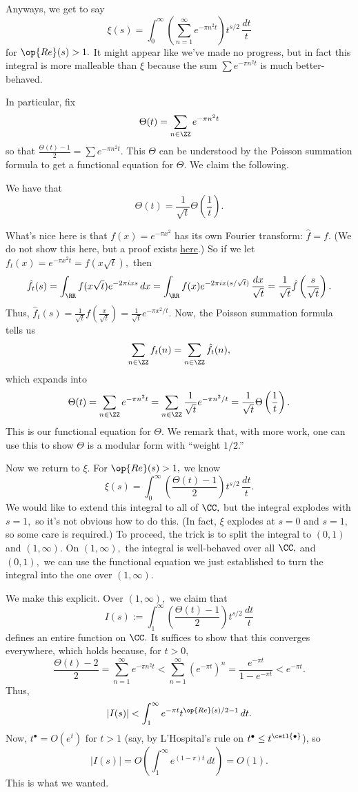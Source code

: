 Anyways, we get to say
\[\xi(s)=\int_0^\infty\left(\sum_{n=1}^\infty e^{-\pi n^2t}\right)t^{s/2}\,\frac{dt}t\]
for $\op{Re}(s)>1.$ It might appear like we've made no progress, but in fact this integral is more malleable than $\xi$ because the sum $\sum e^{-\pi n^2t}$ is much better-behaved.

In particular, fix
\[\Theta(t)=\sum_{n\in\ZZ}e^{-\pi n^2t}\]
so that $\frac{\Theta(t)-1}2=\sum e^{-\pi n^2t}.$ This $\Theta$ can be understood by the Poisson summation formula to get a functional equation for $\Theta.$ We claim the following.
\begin{lemma}
    We have that
    \[\Theta(t)=\frac1{\sqrt t}\Theta\left(\frac1t\right).\]
\end{lemma}
What's nice here is that $f(x)=e^{-\pi x^2}$ has its own Fourier transform: $\hat f=f.$ (We do not show this here, but a proof exists \href{https://math.stackexchange.com/questions/270566/how-to-calculate-the-fourier-transform-of-a-gaussian-function}{here}.) So if we let $f_t(x)=e^{-\pi x^2t}=f(x\sqrt t),$ then
\[\hat f_t(s)=\int_\RR f(x\sqrt t)e^{-2\pi ixs}\,dx=\int_\RR f(x)e^{-2\pi ix(s/\sqrt t)}\,\frac{dx}{\sqrt t}=\frac1{\sqrt t}\hat f\left(\frac s{\sqrt t}\right).\]
Thus, $\hat f_t(s)=\frac1{\sqrt t}f\left(\frac x{\sqrt t}\right)=\frac1{\sqrt t}e^{-\pi x^2/t}.$ Now, the Poisson summation formula tells us
\[\sum_{n\in\ZZ}f_t(n)=\sum_{n\in\ZZ}\hat f_t(n),\]
which expands into
\[\Theta(t)=\sum_{n\in\ZZ}e^{-\pi n^2t}=\sum_{n\in\ZZ}\frac1{\sqrt t}e^{-\pi n^2/t}=\frac1{\sqrt t}\Theta\left(\frac1t\right).\]
This is our functional equation for $\Theta.$ We remark that, with more work, one can use this to show $\Theta$ is a modular form with ``weight $1/2$.''

Now we return to $\xi.$ For $\op{Re}(s)>1,$ we know
\[\xi(s)=\int_0^\infty\left(\frac{\Theta(t)-1}2\right)t^{s/2}\,\frac{dt}t.\]
We would like to extend this integral to all of $\CC,$ but the integral explodes with $s=1,$ so it's not obvious how to do this. (In fact, $\xi$ explodes at $s=0$ and $s=1,$ so some care is required.) To proceed, the trick is to split the integral to $(0,1)$ and $(1,\infty).$ On $(1,\infty),$ the integral is well-behaved over all $\CC,$ and $(0,1),$ we can use the functional equation we just established to turn the integral into the one over $(1,\infty).$

We make this explicit. Over $(1,\infty),$ we claim that
\[I(s):=\int_1^\infty\left(\frac{\Theta(t)-1}2\right)t^{s/2}\,\frac{dt}t\]
defines an entire function on $\CC.$ It suffices to show that this converges everywhere, which holds because, for $t>0,$
\[\frac{\Theta(t)-2}2=\sum_{n=1}^\infty e^{-\pi n^2t}<\sum_{n=1}^\infty\left(e^{-\pi t}\right)^n=\frac{e^{-\pi t}}{1-e^{-\pi t}}<e^{-\pi t}.\]
Thus,
\[|I(s)|<\int_1^\infty e^{-\pi t}t^{\op{Re}(s)/2-1}\,dt.\]
Now, $t^\bullet=O\left(e^t\right)$ for $t>1$ (say, by L'Hospital's rule on $t^\bullet\le t^{\ceil{\bullet}}$), so
\[|I(s)|=O\left(\int_1^\infty e^{(1-\pi)t}\,dt\right)=O(1).\]
This is what we wanted.

